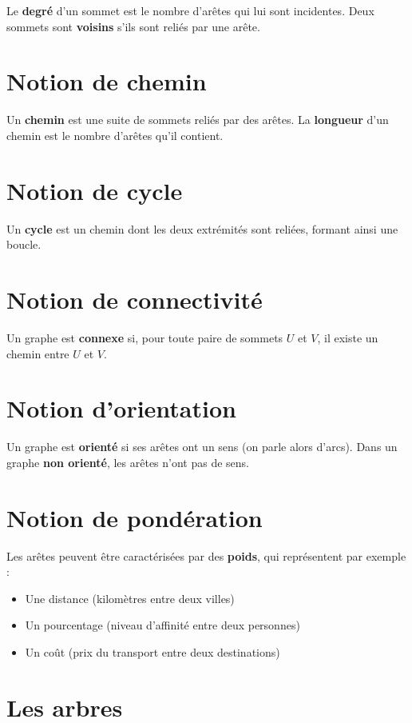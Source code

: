 \documentclass[10pt,a4paper]{article}
\begin{document}
Le \textbf{degré} d'un sommet est le nombre d'arêtes qui lui sont incidentes. Deux sommets sont \textbf{voisins} s'ils sont reliés par une arête.

\section*{Notion de chemin}

Un \textbf{chemin} est une suite de sommets reliés par des arêtes. La \textbf{longueur} d'un chemin est le nombre d'arêtes qu'il contient.

\section*{Notion de cycle}

Un \textbf{cycle} est un chemin dont les deux extrémités sont reliées, formant ainsi une boucle.

\section*{Notion de connectivité}

Un graphe est \textbf{connexe} si, pour toute paire de sommets \( U \) et \( V \), il existe un chemin entre \( U \) et \( V \).

\section*{Notion d'orientation}

Un graphe est \textbf{orienté} si ses arêtes ont un sens (on parle alors d'arcs). Dans un graphe \textbf{non orienté}, les arêtes n'ont pas de sens.

\section*{Notion de pondération}

Les arêtes peuvent être caractérisées par des \textbf{poids}, qui représentent par exemple :
\begin{itemize}
    \item Une distance (kilomètres entre deux villes)
    \item Un pourcentage (niveau d'affinité entre deux personnes)
    \item Un coût (prix du transport entre deux destinations)
\end{itemize}

\section*{Les arbres}
\end{document}
